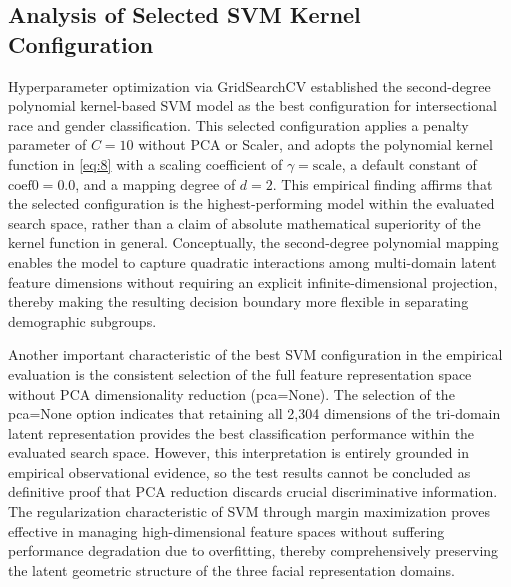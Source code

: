 \subsection{Analysis of Selected SVM Kernel Configuration}
\label{sec:svm_kernel_analysis}

Hyperparameter optimization via GridSearchCV established the second-degree polynomial kernel-based SVM model as the best configuration for intersectional race and gender classification. This selected configuration applies a penalty parameter of $C=10$ without PCA or Scaler, and adopts the polynomial kernel function in \eqref{eq:8} with a scaling coefficient of $\gamma=\text{scale}$, a default constant of $\text{coef0}=0.0$, and a mapping degree of $d=2$. This empirical finding affirms that the selected configuration is the highest-performing model within the evaluated search space, rather than a claim of absolute mathematical superiority of the kernel function in general. Conceptually, the second-degree polynomial mapping enables the model to capture quadratic interactions among multi-domain latent feature dimensions without requiring an explicit infinite-dimensional projection, thereby making the resulting decision boundary more flexible in separating demographic subgroups.

Another important characteristic of the best SVM configuration in the empirical evaluation is the consistent selection of the full feature representation space without PCA dimensionality reduction (pca=None). The selection of the pca=None option indicates that retaining all 2,304 dimensions of the tri-domain latent representation provides the best classification performance within the evaluated search space. However, this interpretation is entirely grounded in empirical observational evidence, so the test results cannot be concluded as definitive proof that PCA reduction discards crucial discriminative information. The regularization characteristic of SVM through margin maximization proves effective in managing high-dimensional feature spaces without suffering performance degradation due to overfitting, thereby comprehensively preserving the latent geometric structure of the three facial representation domains.
